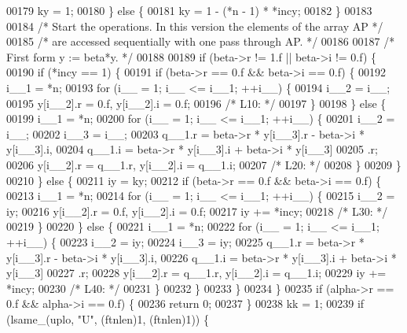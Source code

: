 \begin{DoxyCode}
00179     ky = 1;
00180     \} \textcolor{keywordflow}{else} \{
00181     ky = 1 - (*n - 1) * *incy;
00182     \}
00183 
00184 \textcolor{comment}{/*     Start the operations. In this version the elements of the array AP */}
00185 \textcolor{comment}{/*     are accessed sequentially with one pass through AP. */}
00186 
00187 \textcolor{comment}{/*     First form  y := beta*y. */}
00188 
00189     \textcolor{keywordflow}{if} (beta->r != 1.f || beta->i != 0.f) \{
00190     \textcolor{keywordflow}{if} (*incy == 1) \{
00191         \textcolor{keywordflow}{if} (beta->r == 0.f && beta->i == 0.f) \{
00192         i\_\_1 = *n;
00193         \textcolor{keywordflow}{for} (i\_\_ = 1; i\_\_ <= i\_\_1; ++i\_\_) \{
00194             i\_\_2 = i\_\_;
00195             y[i\_\_2].r = 0.f, y[i\_\_2].i = 0.f;
00196 \textcolor{comment}{/* L10: */}
00197         \}
00198         \} \textcolor{keywordflow}{else} \{
00199         i\_\_1 = *n;
00200         \textcolor{keywordflow}{for} (i\_\_ = 1; i\_\_ <= i\_\_1; ++i\_\_) \{
00201             i\_\_2 = i\_\_;
00202             i\_\_3 = i\_\_;
00203             q\_\_1.r = beta->r * y[i\_\_3].r - beta->i * y[i\_\_3].i, 
00204                 q\_\_1.i = beta->r * y[i\_\_3].i + beta->i * y[i\_\_3]
00205                 .r;
00206             y[i\_\_2].r = q\_\_1.r, y[i\_\_2].i = q\_\_1.i;
00207 \textcolor{comment}{/* L20: */}
00208         \}
00209         \}
00210     \} \textcolor{keywordflow}{else} \{
00211         iy = ky;
00212         \textcolor{keywordflow}{if} (beta->r == 0.f && beta->i == 0.f) \{
00213         i\_\_1 = *n;
00214         \textcolor{keywordflow}{for} (i\_\_ = 1; i\_\_ <= i\_\_1; ++i\_\_) \{
00215             i\_\_2 = iy;
00216             y[i\_\_2].r = 0.f, y[i\_\_2].i = 0.f;
00217             iy += *incy;
00218 \textcolor{comment}{/* L30: */}
00219         \}
00220         \} \textcolor{keywordflow}{else} \{
00221         i\_\_1 = *n;
00222         \textcolor{keywordflow}{for} (i\_\_ = 1; i\_\_ <= i\_\_1; ++i\_\_) \{
00223             i\_\_2 = iy;
00224             i\_\_3 = iy;
00225             q\_\_1.r = beta->r * y[i\_\_3].r - beta->i * y[i\_\_3].i, 
00226                 q\_\_1.i = beta->r * y[i\_\_3].i + beta->i * y[i\_\_3]
00227                 .r;
00228             y[i\_\_2].r = q\_\_1.r, y[i\_\_2].i = q\_\_1.i;
00229             iy += *incy;
00230 \textcolor{comment}{/* L40: */}
00231         \}
00232         \}
00233     \}
00234     \}
00235     \textcolor{keywordflow}{if} (alpha->r == 0.f && alpha->i == 0.f) \{
00236     \textcolor{keywordflow}{return} 0;
00237     \}
00238     kk = 1;
00239     \textcolor{keywordflow}{if} (lsame\_(uplo, \textcolor{stringliteral}{"U"}, (ftnlen)1, (ftnlen)1)) \{

\end{DoxyCode}
